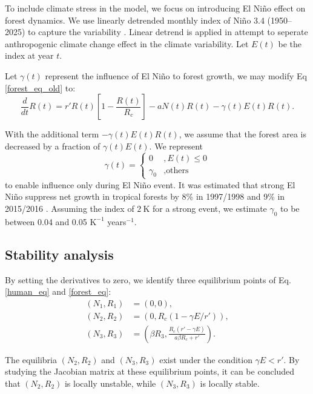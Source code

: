 \documentclass{style}
\begin{document}
To include climate stress in the model, we focus on introducing El Niño effect on forest dynamics. We use linearly detrended monthly index of Niño 3.4 (1950--2025) to capture the variability \cite{huang2017extended}. Linear detrend is applied in attempt to seperate anthropogenic climate change effect in the climate variability. Let $E(t)$ be the index at year $t$.

Let $\gamma(t)$ represent the influence of El Niño to forest growth, we may modify Eq \eqref{forest_eq_old} to:
\begin{equation}
    \frac{d}{dt} R(t) = r' R(t) \left[ 1 - \frac{R(t)}{R_c} \right] - a N(t) R(t) - \gamma(t) E(t) R(t). \label{forest_eq}
\end{equation}

With the additional term $- \gamma(t) E(t) R(t)$, we assume that the forest area is decreased by a fraction of $\gamma(t) E(t)$. We represent 
\begin{equation}
    \gamma(t) = \begin{cases}
        0 &, E(t) \leq 0 \\
        \gamma_0 &, \text{others}
    \end{cases}
\end{equation}
to enable influence only during El Niño event. It was estimated that strong El Niño suppress net growth in tropical forests by 8\% in 1997/1998 and 9\% in 2015/2016 \cite{enso_forest}. Assuming the index of $2 \:\text{K}$ for a strong event, we estimate $\gamma_0$ to be between 0.04 and 0.05 $\text{K}^{-1}$ years${}^{-1}$. 

\subsection{Stability analysis}
By setting the derivatives to zero, we identify three equilibrium points of Eq. \eqref{human_eq} and \eqref{forest_eq}:
\begin{align*}
    (N_1, R_1) &= (0, 0), \\
    (N_2, R_2) &= \left(0, R_c \left(1 - \gamma E / r' \right)\right), \\
    (N_3, R_3) &= \left(\beta R_3, \frac{R_c (r' - \gamma E)}{a \beta R_c + r'} \right).
\end{align*}

The equilibria $(N_2, R_2)$ and $(N_3, R_3)$ exist under the condition $\gamma E < r'$. By studying the Jacobian matrix at these equilibrium points, it can be concluded that $(N_2, R_2)$ is locally unstable, while $(N_3, R_3)$ is locally stable.
\end{document}
